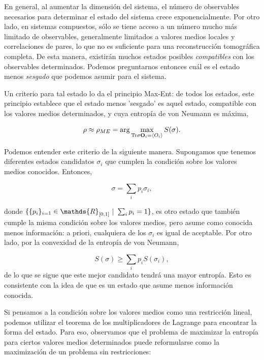 \documentclass{report} %
\numberwithin{equation}{section}
\begin{document}
En general, al aumentar la dimensión del sistema, el número de observables necesarios para determinar el estado del sistema crece exponencialmente.
Por otro lado, en sistemas compuestos, s\'olo se tiene acceso a un n\'umero mucho m\'as limitado de observables, 
generalmente limitados a valores medios locales y correlaciones de pares, lo que no es suficiente para una reconstrucción tomográfica completa.
De esta manera, existirán muchos estados posibles \emph{compatibles} con los observables determinados. Podemos preguntarnos entonces cuál es el estado menos \emph{sesgado} que podemos asumir para el sistema. 

Un criterio para tal estado lo da el principio Max-Ent: de todos los estados, este principio establece que el estado menos 'sesgado' es aquel  estado,  compatible con los valores medios determinados, y cuya entropía de von Neumann es máxima,

\begin{equation*}
\rho\approx \rho_{ME} = \arg\max_{{ \Tr}\sigma {\bf O}_i =\langle  O_i\rangle} S(\sigma).
\end{equation*}

Podemos entender este criterio de la siguiente manera. Supongamos que tenemos diferentes estados candidatos $\sigma_i$ que cumplen la condición sobre los valores medios conocidos. Entonces,

\begin{equation*}
\sigma =\sum_i p_i \sigma_i,
\end{equation*}

donde $\{\{p_i\}_{i=1} \in \mathds{R}_{[0, 1]} \textnormal{ | }\sum_i p_i=1\}$, es otro estado que también cumple la misma condición sobre los valores medios, pero asume como conocida menos información: a priori, cualquiera de los $\sigma_i$ es igual de aceptable. Por otro lado, por la convexidad de la entropía de von Neumann,

\begin{equation*}
S(\sigma)\geq \sum_i p_i S(\sigma_i),
\end{equation*}
de lo que se sigue que este mejor candidato tendrá una mayor entropía. Esto es consistente con la idea de que es un estado que asume menos información conocida. 

Si pensamos a la condición sobre los valores medios como una restricción lineal, podemos utilizar el teorema de los multiplicadores de Lagrange para encontrar la forma del estado. Para eso, observamos que el problema de maximizar la entropía para ciertos valores medios determinados puede reformularse como la maximización de un problema sin restricciones:
\end{document}
